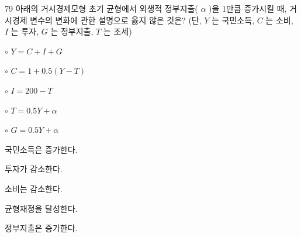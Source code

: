\begin{question}{79}
아래의 거시경제모형 초기 균형에서 외생적 정부지출( $\alpha$ )을 1만큼 증가시킬 때, 거시경제 변수의 변화에 관한 설명으로 옳지 않은 것은? (단, $Y$ 는 국민소득, $C$ 는 소비, $I$ 는 투자, $G$ 는 정부지출, $T$ 는 조세)
\begin{framedtext}
$\circ$ $Y=C+I+G$ \par
$\circ$ $C=1+0.5(Y-T)$ \par
$\circ$ $I=200-T$ \par
$\circ$ $T=0.5Y+\alpha$ \par
$\circ$ $G=0.5Y+\alpha$
\end{framedtext}
\begin{choices}
  \item 국민소득은 증가한다.
  \item 투자가 감소한다.
  \item 소비는 감소한다.
  \item 균형재정을 달성한다.
  \item 정부지출은 증가한다.
\end{choices}
\end{question}
